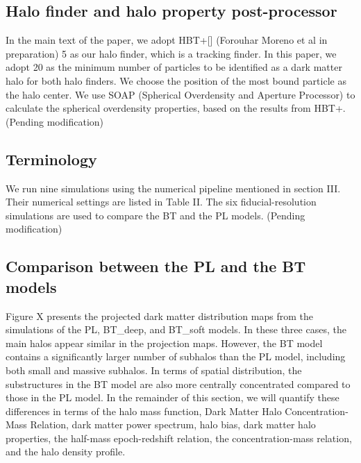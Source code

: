 \documentclass[
 reprint,
 superscriptaddress,
 nofootinbib,
 nobibnotes,
 amsmath,
 amssymb,
 aps,
 prd,
 floatfix,
 longbibliography
]{revtex4-1}
\begin{document}
\subsection{Halo finder and halo property post-processor}
In the main text of the paper, we adopt HBT+[] (Forouhar Moreno et al in preparation) 5 as our halo finder, which is a tracking finder. In this paper, we adopt 20 as the minimum number of particles to be identified as a dark matter halo for both halo finders. We choose the position of the most bound particle as the halo center. We use SOAP (Spherical Overdensity and Aperture Processor) to calculate the spherical overdensity properties, based on the results from HBT+.(Pending modification)

\subsection{Terminology\label{subsec:Terminology}}
We run nine simulations using the numerical pipeline mentioned in section III. Their numerical settings are listed in Table II. The six fiducial-resolution simulations are used to compare the BT and the PL models. (Pending modification)

\subsection{Comparison between the PL and the BT models}\label{subsec:comparison_PL_BT}

Figure X presents the projected dark matter distribution maps from the simulations of the PL, BT\_deep, and BT\_soft models. In these three cases, the main halos appear similar in the projection maps. However, the BT model contains a significantly larger number of subhalos than the PL model, including both small and massive subhalos. In terms of spatial distribution, the substructures in the BT model are also more centrally concentrated compared to those in the PL model. In the remainder of this section, we will quantify these differences in terms of the halo mass function, Dark Matter Halo Concentration-Mass Relation, dark matter power spectrum, halo bias, dark matter halo properties, the half-mass epoch-redshift relation, the concentration-mass relation, and the halo density profile.
\end{document}
